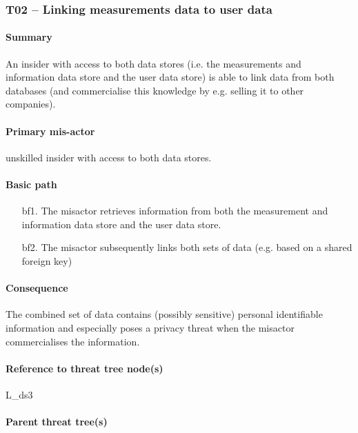 \subsubsection{T02 -- Linking measurements data to user data}
\label{threats:t02}
\paragraph{Summary}

\npar An insider with access to both data stores (i.e. the measurements and
information data store and the user data store) is able to link data from both
databases (and commercialise this knowledge by e.g. selling it to other
companies).

\paragraph{Primary mis-actor}

\npar unskilled insider with access to both data stores.

\paragraph{Basic path}

\begin{enumerate}
	\item[bf1.] The misactor retrieves information from both the measurement and
	information data store and the user data store.
    \item[bf2.] The misactor subsequently links both sets of data (e.g. based
    on a shared foreign key)
\end{enumerate}

\paragraph{Consequence}

\npar The combined set of data contains (possibly sensitive) personal
identifiable information and especially poses a privacy threat when the misactor
commercialises the information.

\paragraph{Reference to threat tree node(s)}

L\_ds3

\paragraph{Parent threat tree(s)}

